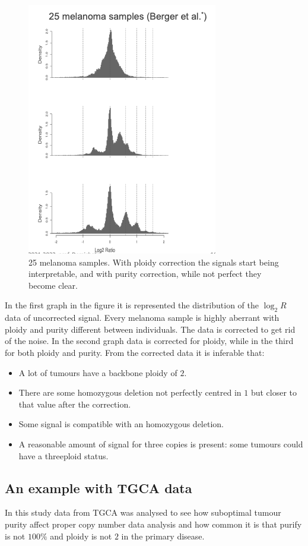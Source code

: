  \begin{figure}[H]
    \centering
    \includegraphics[width=0.4\linewidth]{image8.png}
    \caption{25 melanoma samples. With ploidy correction the signals start being interpretable, and with purity correction, while not perfect they become clear.}
    \label{fig:ploidy2}
  \end{figure}

  In the first graph in the figure it is represented the distribution of the $\log_2 R$ data of uncorrected signal.
  Every melanoma sample is highly aberrant with ploidy and purity different between individuals.
  The data is corrected to get rid of the noise.
  In the second graph data is corrected for ploidy, while in the third for both ploidy and purity.
  From the corrected data it is inferable that:

  \begin{itemize}
    \item A lot of tumours have a backbone ploidy of $2.$
    \item There are some homozygous deletion not perfectly centred in $1$ but closer to that value after the correction.
    \item Some signal is compatible with an homozygous deletion.
    \item A reasonable amount of signal for three copies is present: some tumours could have a threeploid status.
  \end{itemize}

  \subsection{An example with TGCA data}
  In this study data from TGCA was analysed to see how suboptimal tumour purity affect proper copy number data analysis and how common it is that purify is not $100\%$ and ploidy is not $2$ in the primary disease.


